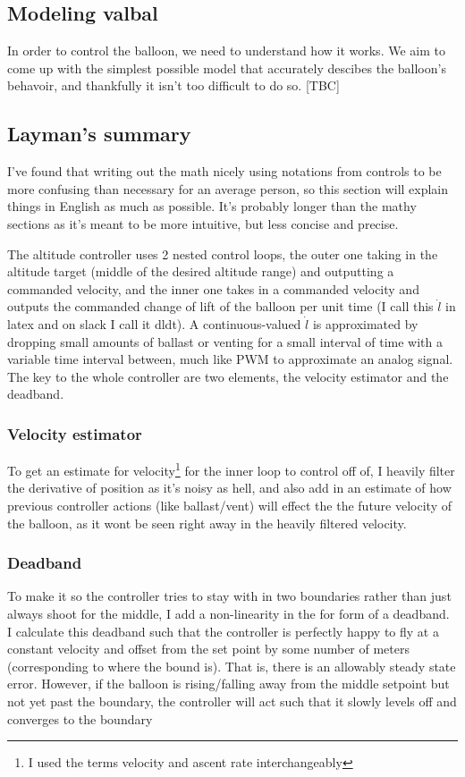 \documentclass[11pt]{article}
\begin{document}
\subsection{Modeling valbal}

In order to control the balloon, we need to understand how it works. We aim to come up with the simplest possible model that accurately descibes the balloon's behavoir, and thankfully it isn't too difficult to do so. [TBC]

\subsection{Layman's summary}

I've found that writing out the math nicely using notations from controls to be more confusing than necessary for an average person, so this section will explain things in English as much as possible. It's probably longer than the mathy sections as it's meant to be more intuitive, but less concise and precise.

The altitude controller uses 2 nested control loops, the outer one taking in the altitude target (middle of the desired altitude range) and outputting a commanded velocity, and the inner one takes in a commanded velocity and outputs the commanded change of lift of the balloon per unit time (I call this $\dot l$ in latex and on slack I call it dldt). A continuous-valued $\dot l$ is approximated by dropping small amounts of ballast or venting for a small interval of time with a variable time interval between, much like PWM to approximate an analog signal. The key to the whole controller are two elements, the velocity estimator and the deadband.

\subsubsection{Velocity estimator}
To get an estimate for velocity\footnote{I used the terms velocity and ascent rate interchangeably} for the inner loop to control off of, I heavily filter the derivative of position as it's noisy as hell, and also add in an estimate of how previous controller actions (like ballast/vent) will effect the the future velocity of the balloon, as it wont be seen right away in the heavily filtered velocity.

\subsubsection{Deadband}
To make it so the controller tries to stay with in two boundaries rather than just always shoot for the middle, I add a non-linearity in the for form of a deadband. I calculate this deadband such that the controller is perfectly happy to fly at a constant velocity and offset from the set point by some number of meters (corresponding to where the bound is). That is, there is an allowably steady state error. However, if the balloon is rising/falling away from the middle setpoint but not yet past the boundary, the controller will act such that it slowly levels off and converges to the  boundary
\end{document}
